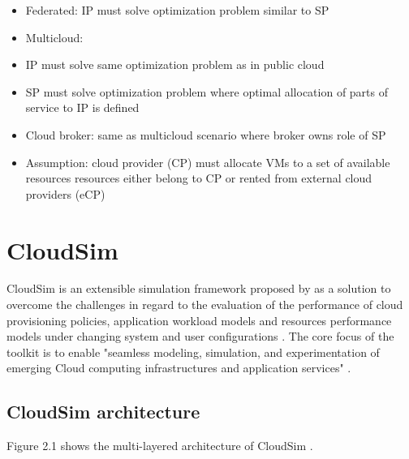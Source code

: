 \begin{itemize}
 	\item Federated: IP must solve optimization problem similar to SP
 	\item Multicloud:
 	\item IP must solve same optimization problem as in public cloud
	\item SP must solve optimization problem where optimal allocation of parts of service to IP is defined
	\item Cloud broker: same as multicloud scenario where broker owns role of SP
	\item Assumption: cloud provider (CP) must allocate VMs to a set of available resources
 resources either belong to CP or rented from external cloud providers (eCP)
\end{itemize}


%
%
%
\section{CloudSim}
CloudSim is an extensible simulation framework proposed by \citeauthor{calheiros_2011} as a solution to overcome the challenges in regard to the evaluation of the performance of cloud provisioning policies, application workload models and resources performance models under changing system and user configurations \cite{calheiros_2011}. The core focus of the toolkit is to enable "seamless modeling, simulation, and experimentation of emerging Cloud computing infrastructures and application services" \cite{calheiros_2011}.
\subsection{CloudSim architecture}

Figure 2.1 shows the multi-layered architecture of CloudSim .

